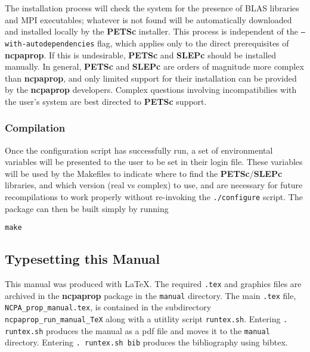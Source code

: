 \noindent The installation process will check the system for the presence of BLAS libraries and MPI executables; whatever is not found will be automatically downloaded and installed locally by the \textbf{PETSc} installer.  This process is independent of the \texttt{--with-autodependencies} flag, which applies only to the direct prerequisites of \textbf{ncpaprop}.  If this is undesirable, \textbf{PETSc} and \textbf{SLEPc} should be installed manually.  In general, \textbf{PETSc} and \textbf{SLEPc} are orders of magnitude more complex than \textbf{ncpaprop}, and only limited support for their installation can be provided by the \textbf{ncpaprop} developers.  Complex questions involving incompatibilies with the user's system are best directed to \textbf{PETSc} support.

\subsubsection{Compilation}

Once the configuration script has successfully run, a set of environmental variables will be presented to the user to be set in their login file.  These variables will be used by the Makefiles to indicate where to find the \textbf{PETSc}/\textbf{SLEPc} libraries, and which version (real vs complex) to use, and are necessary for future recompilations to work properly without re-invoking the \texttt{./configure} script.  The package can then be built simply by running

\texttt{make}


\subsection{Typesetting this Manual}

This manual was produced with LaTeX. The required \verb+.tex+ and graphics files are archived in the \textbf{ncpaprop} package in the \verb+manual+ directory. The main \verb+.tex+ file, \verb+NCPA_prop_manual.tex+, is contained in the subdirectory \verb+ncpaprop_run_manual_TeX+ along with a utitlity script \verb+runtex.sh+. Entering \verb+. runtex.sh+ produces the manual as a pdf file and moves it to the \verb+manual+ directory. Entering \verb+. runtex.sh bib+ produces the bibliography using bibtex. 